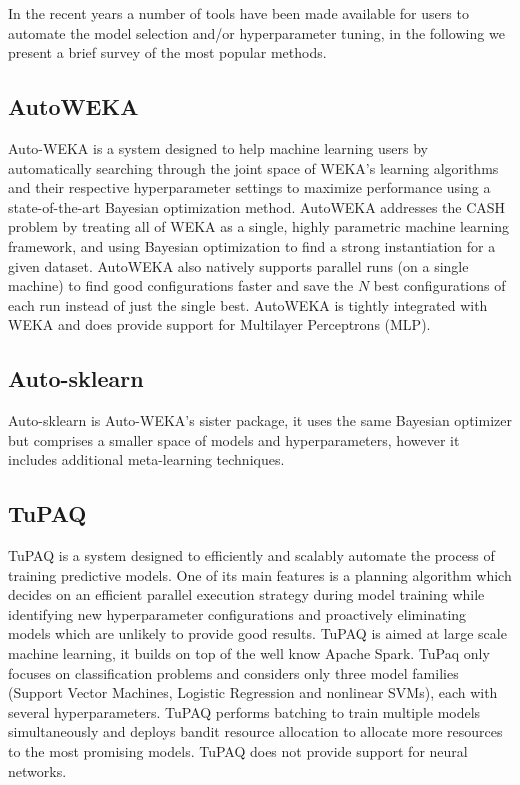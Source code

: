 \documentclass[journal]{IEEEtran}
\begin{document}
In the recent years a number of tools have been made available for users to automate the model selection and/or hyperparameter tuning, in the following we present a brief survey of the most popular methods.

\subsection{AutoWEKA}

Auto-WEKA \cite{Thornton2016} is a system designed to help machine learning users by automatically searching through the joint space of WEKA's learning algorithms and their respective hyperparameter settings to maximize performance using a state-of-the-art Bayesian optimization method. AutoWEKA addresses the CASH problem by treating all of WEKA as a single, highly parametric machine learning framework, and using Bayesian optimization to find a strong instantiation for a given dataset. AutoWEKA also natively supports parallel runs (on a single machine) to find good configurations faster and save the $N$ best configurations of each run instead of just the single best. AutoWEKA is tightly integrated with WEKA and does provide support for Multilayer Perceptrons (MLP).

\subsection{Auto-sklearn}

Auto-sklearn \cite{Feurer2015} is Auto-WEKA's sister package, it uses the same Bayesian optimizer but comprises a smaller space of models and hyperparameters, however it includes additional meta-learning techniques.

\subsection{TuPAQ}

TuPAQ \cite{sparks2015} is a system designed to efficiently and scalably automate the process of training predictive models. One of its main features is a planning algorithm which decides on an efficient parallel execution strategy during model training while identifying new hyperparameter configurations and proactively eliminating models which are unlikely to provide good results. TuPAQ is aimed at large scale machine learning, it builds on top of the well know Apache Spark. TuPaq only focuses on classification problems and considers only three model families (Support Vector Machines, Logistic Regression and nonlinear SVMs), each with several hyperparameters. TuPAQ performs batching to train multiple models simultaneously and deploys bandit resource allocation to allocate more resources to the most promising models. TuPAQ does not provide support for neural networks.
\end{document}
